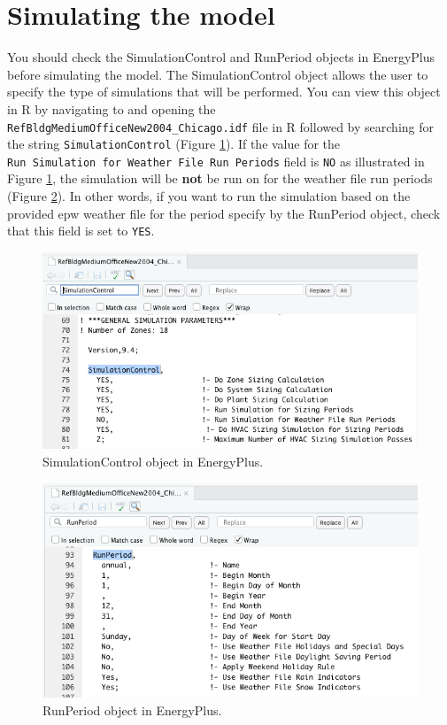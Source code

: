 \documentclass[
]{book}
\begin{document}
\hypertarget{simulating-the-model}{%
\section{Simulating the model}\label{simulating-the-model}}

You should check the SimulationControl and RunPeriod objects in EnergyPlus before simulating the model. The SimulationControl object allows the user to specify the type of simulations that will be performed. You can view this object in R by navigating to and opening the \texttt{RefBldgMediumOfficeNew2004\_Chicago.idf} file in R followed by searching for the string \texttt{SimulationControl} (Figure \ref{fig:sim-control}). If the value for the \texttt{Run\ Simulation\ for\ Weather\ File\ Run\ Periods} field is \texttt{NO} as illustrated in Figure \ref{fig:sim-control}, the simulation will be \textbf{not} be run on for the weather file run periods (Figure \ref{fig:run-period}). In other words, if you want to run the simulation based on the provided epw weather file for the period specify by the RunPeriod object, check that this field is set to \texttt{YES}.

\begin{figure}

{\centering \includegraphics[width=0.8\linewidth]{figures/sim_control} 

}

\caption{SimulationControl object in EnergyPlus.}\label{fig:sim-control}
\end{figure}

\begin{figure}

{\centering \includegraphics[width=0.8\linewidth]{figures/run_period} 

}

\caption{RunPeriod object in EnergyPlus.}\label{fig:run-period}
\end{figure}
\end{document}
